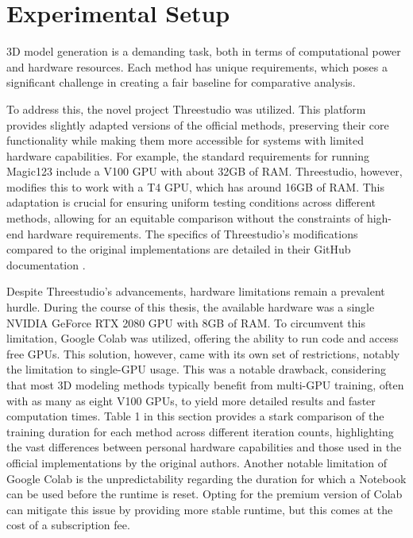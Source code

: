 \section{Experimental Setup}\label{Setup}

3D model generation is a demanding task, both in terms of computational power and hardware resources. Each method has unique requirements, which poses a significant challenge in creating a fair baseline for comparative analysis.

To address this, the novel project Threestudio \citep{threestudio2023} was utilized. This platform provides slightly adapted versions of the official methods, preserving their core functionality while making them more accessible for systems with limited hardware capabilities. For example, the standard requirements for running Magic123 \citep{qian2023magic123} include a V100 GPU with about 32GB of RAM. Threestudio, however, modifies this to work with a T4 GPU, which has around 16GB of RAM. This adaptation is crucial for ensuring uniform testing conditions across different methods, allowing for an equitable comparison without the constraints of high-end hardware requirements. The specifics of Threestudio's modifications compared to the original implementations are detailed in their GitHub documentation \citep{threestudio2023}.

Despite Threestudio's advancements, hardware limitations remain a prevalent hurdle. During the course of this thesis, the available hardware was a single NVIDIA GeForce RTX 2080 GPU with 8GB of RAM. To circumvent this limitation, Google Colab \citep{googlecolab} was utilized, offering the ability to run code and access free GPUs. This solution, however, came with its own set of restrictions, notably the limitation to single-GPU usage. This was a notable drawback, considering that most 3D modeling methods typically benefit from multi-GPU training, often with as many as eight V100 GPUs, to yield more detailed results and faster computation times. Table 1 in this section provides a stark comparison of the training duration for each method across different iteration counts, highlighting the vast differences between personal hardware capabilities and those used in the official implementations by the original authors. Another notable limitation of Google Colab is the unpredictability regarding the duration for which a Notebook can be used before the runtime is reset. Opting for the premium version of Colab can mitigate this issue by providing more stable runtime, but this comes at the cost of a subscription fee.

